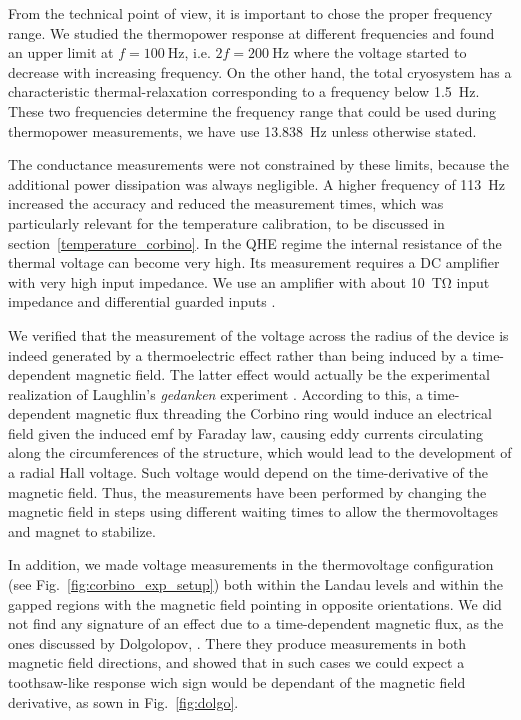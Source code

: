 From the technical point of view, it is important to chose the proper frequency range. We studied the thermopower response at different frequencies and found an upper limit at $f = \SI{100}{\hertz}$, i.e. $2f = \SI{200}{\hertz}$ where the voltage started to decrease with increasing frequency. On the other hand, the total cryosystem has a characteristic thermal-relaxation corresponding to a frequency below \SI{1.5}{\hertz}. These two frequencies determine the frequency range that could be used during thermopower measurements, we have use \SI{13.838}{\hertz} unless otherwise stated.

The conductance measurements were not constrained by these limits, because the additional power dissipation was always negligible. A higher frequency of \SI{113}{\hertz} increased the accuracy and reduced the measurement times, which was particularly relevant for the temperature calibration, to be discussed in section~\ref{temperature_corbino}. In the QHE regime the internal resistance of the thermal voltage can become very high. Its measurement requires a DC amplifier with very high input impedance. We use an amplifier with about \SI{10}{\tera\ohm} input impedance and differential guarded inputs \cite{Maerki2017}.

We verified that the measurement of the voltage across the radius of the device is indeed generated by a thermoelectric effect rather than being induced  by a time-dependent magnetic field. The latter effect would actually be the experimental realization of Laughlin's {\em gedanken} experiment \cite{laughlin1981quantized}. According to this, a time-dependent magnetic flux threading  the Corbino ring would induce an electrical field given the induced emf by Faraday law, causing eddy currents circulating along the circumferences of the structure, which would lead to the development of a radial Hall voltage. Such voltage would depend on the time-derivative of the magnetic field. 
Thus, the measurements have been performed by changing the magnetic field in steps using different waiting times to allow the thermovoltages and magnet to stabilize.

In addition, we made voltage measurements in the thermovoltage configuration (see Fig.~\ref{fig:corbino_exp_setup}) both within the Landau levels and within the gapped regions with the magnetic field pointing in opposite orientations.
We did not find any signature of an effect due to a time-dependent magnetic flux, as the ones discussed by Dolgolopov, \etal\cite{dolgopolov1992quantum,dolgopolov1993charge}. There they produce measurements in both magnetic field directions, and showed that in such cases we could expect a toothsaw-like response wich sign would be dependant of the magnetic field derivative, as sown in Fig.~\ref{fig:dolgo}.

